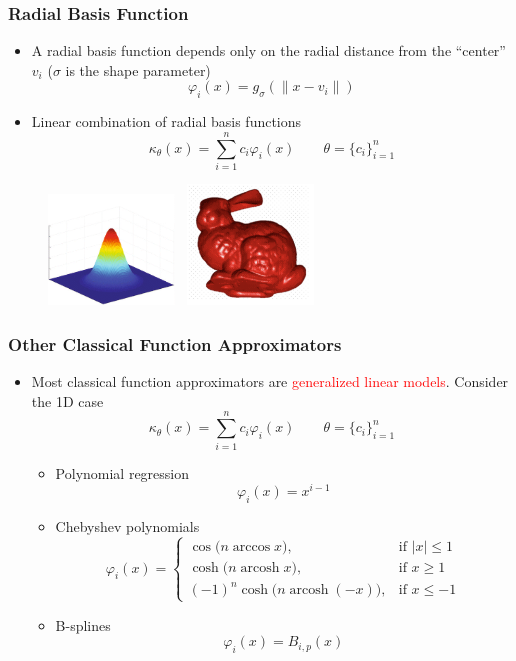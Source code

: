 \documentclass{beamer}
\newcommand{\red}[1]{\textcolor{red}{#1}}
\begin{document}
\begin{frame}
\frametitle{Radial Basis Function}
\begin{itemize}
	\item A radial basis function depends only on the radial distance from the ``center'' $v_i$ ($\sigma$ is the shape parameter)
	$$\varphi_i(x) = g_{\sigma}(\|x-v_i\|)$$
	\item Linear combination of radial basis functions
	\begin{equation*}
		\kappa_{\theta}(x) = \sum_{i=1}^n c_i\varphi_i(x)\qquad \theta = \{c_i\}_{i=1}^n
	\end{equation*}
\end{itemize}
\begin{figure}[hbt]
  \includegraphics[width=0.3\textwidth]{figures/rbf}~
  \includegraphics[width=0.3\textwidth]{figures/rbfapp}
\end{figure}

\end{frame}


\begin{frame}
\frametitle{Other Classical Function Approximators}

\begin{itemize}
	\item Most classical function approximators are \red{generalized linear models}. Consider the 1D case
	\begin{equation*}
		\kappa_{\theta}(x) = \sum_{i=1}^n c_i\varphi_i(x)\qquad \theta = \{c_i\}_{i=1}^n
	\end{equation*}
	
	\begin{itemize}
	\item Polynomial regression 
	$$\varphi_i(x) = x^{i-1} $$
	\item Chebyshev polynomials
	$$\varphi_i(x) = \begin{cases}
\cos\big(n \arccos x \big), & \text{if }|x| \le 1 \\
\cosh\big(n \operatorname{arcosh} x \big), & \text{if }x \ge 1 \\ 
(-1)^n \cosh\big(n \operatorname{arcosh} (-x) \big), & \text{if }x \le -1  
\end{cases}$$
\item B-splines
$$\varphi_i(x) = B_{i,p}(x)$$
	\end{itemize}
\end{itemize}
\end{frame}
\end{document}
